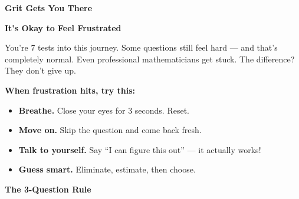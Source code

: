 \clearpage
\thispagestyle{empty}
{\sffamily

\begin{center}
{\fontsize{22}{26}\selectfont\bfseries\color{funRed} \faFistRaised\hspace{3mm}Grit Gets You There\hspace{3mm}\faFistRaised}

\vspace{2mm}
{\color{funGray}\hrulefill}
\end{center}

\vspace{3mm}

\begin{tcolorbox}[
    enhanced,
    colback=funRedLight,
    colframe=funRed!40,
    arc=10pt,
    boxrule=1.5pt,
    left=6mm, right=6mm, top=5mm, bottom=5mm,
]
{\large\bfseries\color{funRedDark} \faHeartbeat\hspace{2mm}It's Okay to Feel Frustrated}

\vspace{2mm}

You're 7 tests into this journey. Some questions still feel hard — and that's completely normal. Even professional mathematicians get stuck. The difference? They don't give up.

\vspace{3mm}

\textbf{When frustration hits, try this:}

\vspace{2mm}

\begin{itemize}[leftmargin=6mm, itemsep=3pt]
    \item[\textcolor{funRed}{\faStar}] \textbf{Breathe.} Close your eyes for 3 seconds. Reset.
    \item[\textcolor{funRed}{\faStar}] \textbf{Move on.} Skip the question and come back fresh.
    \item[\textcolor{funRed}{\faStar}] \textbf{Talk to yourself.} Say ``I can figure this out'' — it actually works!
    \item[\textcolor{funRed}{\faStar}] \textbf{Guess smart.} Eliminate, estimate, then choose.
\end{itemize}
\end{tcolorbox}

\vspace{3mm}

\begin{tcolorbox}[
    enhanced,
    colback=funYellowLight,
    colframe=funYellow!60,
    arc=10pt,
    boxrule=1pt,
    left=6mm, right=6mm, top=4mm, bottom=4mm,
]
{\bfseries\color{funYellowDark} \faLightbulb\hspace{2mm}The 3-Question Rule}


\end{tcolorbox}}
